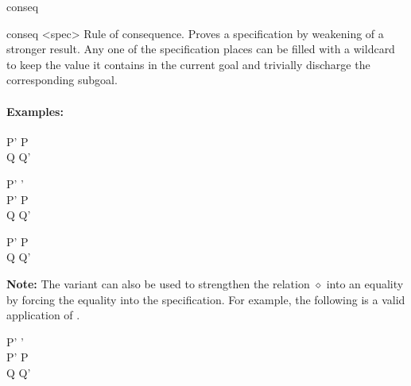 \begin{tactic}{conseq}
  \begin{tsyntax}{conseq <spec>}
  Rule of consequence. Proves a specification by weakening of a
  stronger result. Any one of the specification places can be filled
  with a wildcard \ec{_} to keep the value it contains in the current
  goal and trivially discharge the corresponding subgoal.

  \paragraph{Examples:}\strut
  
  \begin{cmathpar}
    {P' \Rightarrow P \\ Q \Rightarrow Q' \\ }
    {}

    {P' \Rightarrow \delta \mathrel{\diamond} \delta' \\
     P' \Rightarrow P \\
     Q \mathrel{\diamond^\uparrow} Q' \\
     }
    {}

    {P' \Rightarrow P \\ Q \Rightarrow Q' \\ }
    {}
  \end{cmathpar}

  \textbf{Note:} The \phl variant can also be used to strengthen the
  relation $\diamond$ into an equality by forcing the equality into
  the specification. For example, the following is a valid application
  of .

  \begin{cmathpar}
    {P' \Rightarrow \delta \mathrel{=} \delta' \\
     P' \Rightarrow P \\
     Q \mathrel{\Leftrightarrow} Q' \
     }
    {}
  \end{cmathpar}  
  \end{tsyntax}


\end{tactic}
